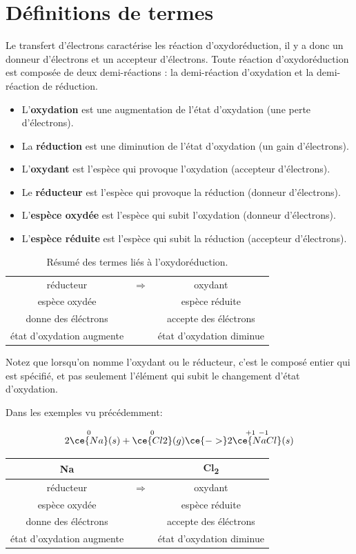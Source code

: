 \documentclass[
  11pt,
  french,
  a4paper,
  openany]{book}
\providecommand{\tightlist}{%
  \setlength{\itemsep}{0pt}\setlength{\parskip}{0pt}}
\begin{document}
\clearpage

\hypertarget{duxe9finitions-de-termes}{%
\section{Définitions de termes}\label{duxe9finitions-de-termes}}

Le transfert d'électrons caractérise les réaction d'oxydoréduction, il y a donc un donneur d'électrons et un accepteur d'électrons. Toute réaction d'oxydoréduction est composée de deux demi-réactions : la demi-réaction d'oxydation et la demi-réaction de réduction.

\begin{itemize}
\tightlist
\item
  L'\textbf{oxydation} est une augmentation de l'état d'oxydation (une perte d'électrons).
\item
  La \textbf{réduction} est une diminution de l'état d'oxydation (un gain d'électrons).
\item
  L'\textbf{oxydant} est l'espèce qui provoque l'oxydation (accepteur d'électrons).
\item
  Le \textbf{réducteur} est l'espèce qui provoque la réduction (donneur d'électrons).
\item
  L'\textbf{espèce oxydée} est l'espèce qui subit l'oxydation (donneur d'électrons).
\item
  L'\textbf{espèce réduite} est l'espèce qui subit la réduction (accepteur d'électrons).
\end{itemize}

\begin{longtable}[]{@{}ccc@{}}
\caption{\label{tab:tab-NO-summary} Résumé des termes liés à l'oxydoréduction.}\tabularnewline
\toprule
\endhead
réducteur & \(\Rightarrow\) & oxydant\tabularnewline
espèce oxydée & & espèce réduite\tabularnewline
donne des éléctrons & & accepte des éléctrons\tabularnewline
état d'oxydation augmente & & état d'oxydation diminue\tabularnewline
\bottomrule
\end{longtable}

Notez que lorsqu'on nomme l'oxydant ou le réducteur, c'est le composé entier qui est spécifié, et pas seulement l'élément qui subit le changement d'état d'oxydation.

Dans les exemples vu précédemment:

\[
2\overset{0}{\ce{Na}}(s) + \overset{0}{\ce{Cl2}}(g) \ce{->} 2\overset{+1\ -1}{\ce{NaCl}}(s)
\]

\begin{longtable}[]{@{}ccc@{}}
\toprule
Na & & Cl\textsubscript{2}\tabularnewline
\midrule
\endhead
réducteur & \(\Rightarrow\) & oxydant\tabularnewline
espèce oxydée & & espèce réduite\tabularnewline
donne des éléctrons & & accepte des éléctrons\tabularnewline
état d'oxydation augmente & & état d'oxydation diminue\tabularnewline
\bottomrule
\end{longtable}
\end{document}
